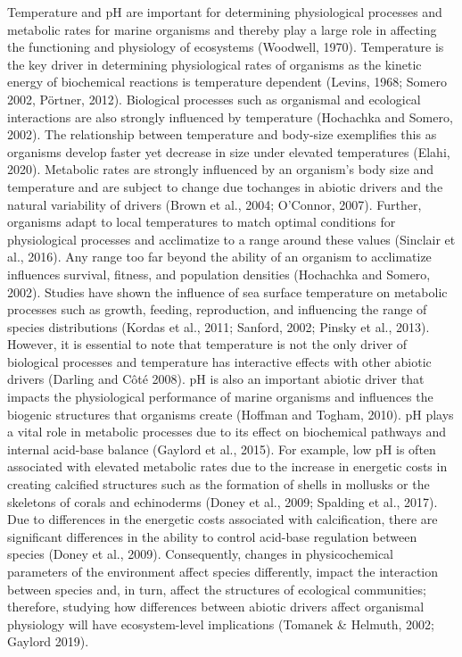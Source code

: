 \documentclass[
  11pt,
]{article}
\begin{document}
Temperature and pH are important for determining physiological processes
and metabolic rates for marine organisms and thereby play a large role
in affecting the functioning and physiology of ecosystems (Woodwell,
1970). Temperature is the key driver in determining physiological rates
of organisms as the kinetic energy of biochemical reactions is
temperature dependent (Levins, 1968; Somero 2002, Pörtner, 2012).
Biological processes such as organismal and ecological interactions are
also strongly influenced by temperature (Hochachka and Somero, 2002).
The relationship between temperature and body-size exemplifies this as
organisms develop faster yet decrease in size under elevated
temperatures (Elahi, 2020). Metabolic rates are strongly influenced by
an organism's body size and temperature and are subject to change due
tochanges in abiotic drivers and the natural variability of drivers
(Brown et al., 2004; O'Connor, 2007). Further, organisms adapt to local
temperatures to match optimal conditions for physiological processes and
acclimatize to a range around these values (Sinclair et al., 2016). Any
range too far beyond the ability of an organism to acclimatize
influences survival, fitness, and population densities (Hochachka and
Somero, 2002). Studies have shown the influence of sea surface
temperature on metabolic processes such as growth, feeding,
reproduction, and influencing the range of species distributions (Kordas
et al., 2011; Sanford, 2002; Pinsky et al., 2013). However, it is
essential to note that temperature is not the only driver of biological
processes and temperature has interactive effects with other abiotic
drivers (Darling and Côté 2008). pH is also an important abiotic driver
that impacts the physiological performance of marine organisms and
influences the biogenic structures that organisms create (Hoffman and
Togham, 2010). pH plays a vital role in metabolic processes due to its
effect on biochemical pathways and internal acid-base balance (Gaylord
et al., 2015). For example, low pH is often associated with elevated
metabolic rates due to the increase in energetic costs in creating
calcified structures such as the formation of shells in mollusks or the
skeletons of corals and echinoderms (Doney et al., 2009; Spalding et
al., 2017). Due to differences in the energetic costs associated with
calcification, there are significant differences in the ability to
control acid-base regulation between species (Doney et al., 2009).
Consequently, changes in physicochemical parameters of the environment
affect species differently, impact the interaction between species and,
in turn, affect the structures of ecological communities; therefore,
studying how differences between abiotic drivers affect organismal
physiology will have ecosystem-level implications (Tomanek \& Helmuth,
2002; Gaylord 2019).
\end{document}
